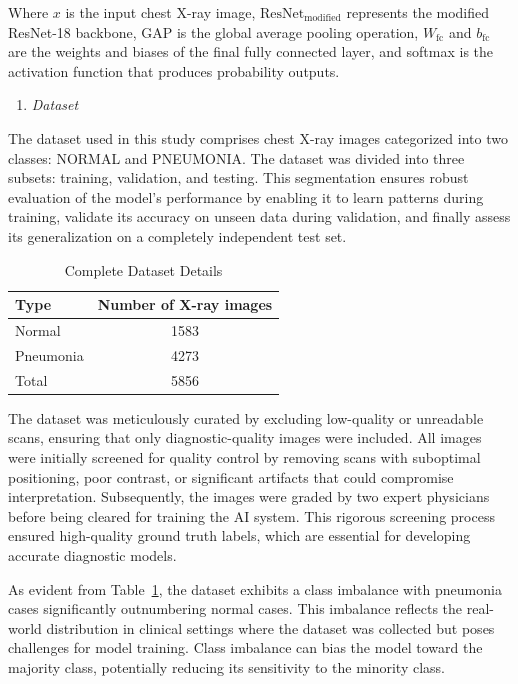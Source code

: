 \documentclass[
  twocolumn,
  10pt,
  a4paper,
  journal
]{IEEEtran}
\begin{document}
Where $x$ is the input chest X-ray image, $\text{ResNet}_{\text{modified}}$ represents the modified ResNet-18 backbone, GAP is the global average pooling operation, $W_{\text{fc}}$ and $b_{\text{fc}}$ are the weights and biases of the final fully connected layer, and softmax is the activation function that produces probability outputs.

\begin{enumerate}
\def\labelenumi{\Alph{enumi}.}
\setcounter{enumi}{2}
\item
  \emph{Dataset}
\end{enumerate}

The dataset used in this study comprises chest X-ray images categorized into two classes: NORMAL and PNEUMONIA. The dataset was divided into three subsets: training, validation, and testing. This segmentation ensures robust evaluation of the model's performance by enabling it to learn patterns during training, validate its accuracy on unseen data during validation, and finally assess its generalization on a completely independent test set.

\begin{table}[t]
\centering
\caption{Complete Dataset Details}
\label{tab:dataset}
\begin{tabular}{lc}
\hline
\textbf{Type} & \textbf{Number of X-ray images} \\
\hline
Normal & 1583 \\
Pneumonia & 4273 \\
\hline
Total & 5856 \\
\hline
\end{tabular}
\end{table}

The dataset was meticulously curated by excluding low-quality or unreadable scans, ensuring that only diagnostic-quality images were included. All images were initially screened for quality control by removing scans with suboptimal positioning, poor contrast, or significant artifacts that could compromise interpretation. Subsequently, the images were graded by two expert physicians before being cleared for training the AI system. This rigorous screening process ensured high-quality ground truth labels, which are essential for developing accurate diagnostic models.

As evident from Table~\ref{tab:dataset}, the dataset exhibits a class imbalance with pneumonia cases significantly outnumbering normal cases. This imbalance reflects the real-world distribution in clinical settings where the dataset was collected but poses challenges for model training. Class imbalance can bias the model toward the majority class, potentially reducing its sensitivity to the minority class.
\end{document}
